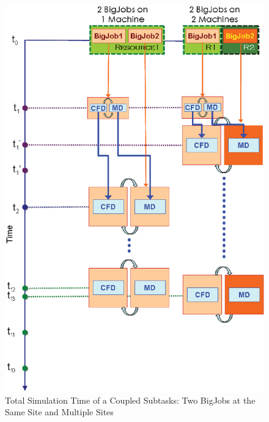 \documentclass[conference,final]{IEEEtran}
\begin{document}
\begin{figure}
\centering
\includegraphics[scale=0.40]{Simulation_Time_of_Two_BigJobs.eps}
\caption{Total Simulation Time of a Coupled Subtasks: Two BigJobs at the Same Site and Multiple Sites}
\label{Fig:TwoBigJobs}
\end{figure}
\end{document}
